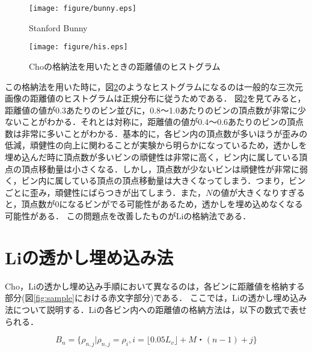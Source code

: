 \documentclass[11pt]{jreport}
\begin{document}
{\begin{figure}
  \begin{center}
    \texttt{[image: figure/bunny.eps]}
  \end{center}
  \caption{Stanford Bunny}
  \label{fig:usagi}
\end{figure}

\begin{figure}
  \begin{center}
    \texttt{[image: figure/his.eps]}
  \end{center}
  \caption{Choの格納法を用いたときの距離値のヒストグラム}
  \label{fig:cho}
\end{figure}
この格納法を用いた時に，図\ref{fig:cho}のようなヒストグラムになるのは一般的な三次元画像の距離値のヒストグラムは正規分布に従うためである．
図\ref{fig:cho}を見てみると，距離値の値が0.3あたりのビン並びに，0.8～1.0あたりのビンの頂点数が非常に少ないことがわかる．それとは対称に，距離値の値が0.4～0.6あたりのビンの頂点数は非常に多いことがわかる．基本的に，各ビン内の頂点数が多いほうが歪みの低減，頑健性の向上に関わることが実験から明らかになっているため，透かしを埋め込んだ時に頂点数が多いビンの頑健性は非常に高く，ビン内に属している頂点の頂点移動量は小さくなる．しかし，頂点数が少ないビンは頑健性が非常に弱く，ビン内に属している頂点の頂点移動量は大きくなってしまう．つまり，ビンごとに歪み，頑健性にばらつきが出てしまう．また，\begin{math}N\end{math}の値が大きくなりすぎると，頂点数が0になるビンがでる可能性があるため，透かしを埋め込めなくなる可能性がある．
この問題点を改善したものがLiの格納法である．




















\section{Liの透かし埋め込み法}
Cho，Liの透かし埋め込み手順において異なるのは，各ビンに距離値を格納する部分(図\ref{fig:sample}における赤文字部分)である．
ここでは，Liの透かし埋め込み法\cite{Li}について説明する．Liの各ビン内への距離値の格納方法は，以下の数式で表せられる．

\begin{equation}
B_n=\{{\rho_{n,j}}|{\rho_{n,j}=\rho_{i}},i=\lfloor 0.05L_v \rfloor +M・(n-1)+j \}
\end{equation}

}
\end{document}
